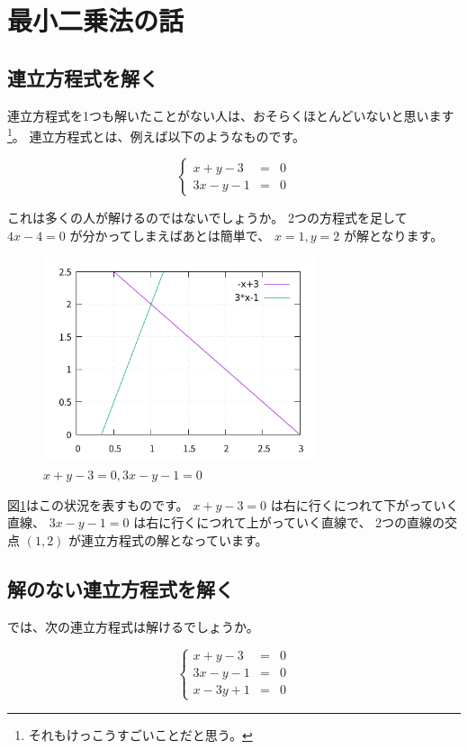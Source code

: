 \documentclass[uplatex,dvipdfmx]{jsarticle}
\begin{document}
\section{最小二乗法の話}
\subsection{連立方程式を解く}
  連立方程式を1つも解いたことがない人は、おそらくほとんどいないと思います
  \footnote{それもけっこうすごいことだと思う。}。
  連立方程式とは、例えば以下のようなものです。

  \begin{equation}
    \left\{
    \begin{array}{lll}
      x + y - 3 &=& 0 \\
      3x - y - 1 &=& 0
    \end{array}
    \right.
  \end{equation}

  これは多くの人が解けるのではないでしょうか。
  2つの方程式を足して $4x - 4 = 0$ が分かってしまえばあとは簡単で、
  $x = 1, y = 2$ が解となります。

  \begin{figure}
    \centering
    \includegraphics[width=8cm]{simul1.png}
    \caption{$x + y - 3 = 0, 3x - y - 1 = 0$}
    \label{simul1}
  \end{figure}

  図\ref{simul1}はこの状況を表すものです。
  $x + y - 3 = 0$ は右に行くにつれて下がっていく直線、
  $3x - y - 1 = 0$ は右に行くにつれて上がっていく直線で、
  2つの直線の交点 $(1, 2)$ が連立方程式の解となっています。

\subsection{解のない連立方程式を解く}
  では、次の連立方程式は解けるでしょうか。

  \begin{equation}
    \label{unresolvable-simul-eq}
    \left\{
    \begin{array}{lll}
      x + y - 3 &=& 0 \\
      3x - y - 1 &=& 0 \\
      x - 3y + 1 &=& 0
    \end{array}
    \right.
  \end{equation}
  
\end{document}
